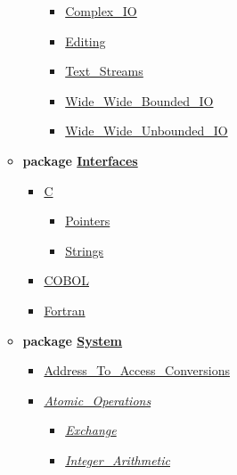 \documentclass[english]{article}
\begin{document}
\begin{scriptsize}
\begin{multicols*}{5}
\begin{itemize}[leftmargin=0mm]
\begin{itemize}[leftmargin=5mm]
\begin{itemize}[leftmargin=5mm]
\begin{itemize}[leftmargin=5mm]
	  \item[] \href{http://www.ada-auth.org/standards/22rm/html/RM-G-1-5.html}{Complex\_IO}
	  \item[] \href{http://www.ada-auth.org/standards/22rm/html/RM-F-3-5.html}{Editing}
	  \item[] \href{http://www.ada-auth.org/standards/22rm/html/RM-A-12-4.html}{Text\_Streams}
	  \item[] \href{http://www.ada-auth.org/standards/22rm/html/RM-A-11.html}{Wide\_Wide\_Bounded\_IO}
	  \item[] \href{http://www.ada-auth.org/standards/22rm/html/RM-A-11.html}{Wide\_Wide\_Unbounded\_IO}
	  \end{itemize}
	\end{itemize}
  \item[] \textbf{package \href{http://www.ada-auth.org/standards/22rm/html/RM-B-2.html}{Interfaces}}
	\begin{itemize}[leftmargin=5mm]
	\item[] \href{http://www.ada-auth.org/standards/22rm/html/RM-B-3.html}{C}
	  \begin{itemize}[leftmargin=5mm]
	  \item[] \href{http://www.ada-auth.org/standards/22rm/html/RM-B-3-2.html}{Pointers}
	  \item[] \href{http://www.ada-auth.org/standards/22rm/html/RM-B-3-1.html}{Strings}
	  \end{itemize}
	\item[] \href{http://www.ada-auth.org/standards/22rm/html/RM-B-4.html}{COBOL}
	\item[] \href{http://www.ada-auth.org/standards/22rm/html/RM-B-5.html}{Fortran}
	\end{itemize}
  \item[] \textbf{package \href{http://www.ada-auth.org/standards/22rm/html/RM-13-7.html}{System}}
	\begin{itemize}[leftmargin=5mm]
	\item[] \href{http://www.ada-auth.org/standards/22rm/html/RM-13-7-2.html}{Address\_To\_Access\_Conversions}
	\item[] \href{http://www.ada-auth.org/standards/22rm/html/RM-C-6-1.html}{\textit{Atomic\_Operations}}
	  \begin{itemize}[leftmargin=5mm]
	  \item[] \href{http://www.ada-auth.org/standards/22rm/html/RM-C-6-2.html}{\textit{Exchange}}
	  \item[] \href{http://www.ada-auth.org/standards/22rm/html/RM-C-6-4.html}{\textit{Integer\_Arithmetic}}

\end{itemize}
\end{itemize}
\end{itemize}
\end{itemize}
\end{multicols*}
\end{scriptsize}
\end{document}
